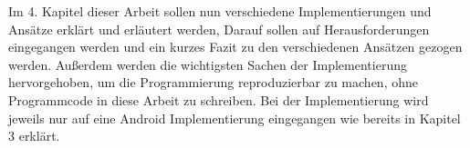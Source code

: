 Im 4. Kapitel dieser Arbeit sollen nun verschiedene Implementierungen und Ansätze erklärt und erläutert werden, Darauf sollen auf Herausforderungen eingegangen werden und ein kurzes Fazit zu den verschiedenen Ansätzen gezogen werden. Außerdem werden die wichtigsten Sachen der Implementierung hervorgehoben, um die Programmierung reproduzierbar zu machen, ohne Programmcode in diese Arbeit zu schreiben. Bei der Implementierung wird jeweils nur auf eine Android Implementierung eingegangen wie bereits in Kapitel 3 erklärt. 







